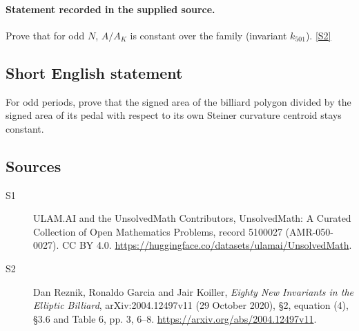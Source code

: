 \documentclass[11pt]{article}
\newcommand{\sref}[2]{\hyperlink{source:#1:#2}{[S#2]}}
\begin{document}
\paragraph{Statement recorded in the supplied source.}
Prove that for odd $N$, $A/A_K$ is constant over the family (invariant $k_{501}$). \sref{5100027}{2}
\subsection{Short English statement}
For odd periods, prove that the signed area of the billiard polygon divided by the signed area of its pedal with respect to its own Steiner curvature centroid stays constant.
\subsection{Sources}
\begin{description}
\item[\hypertarget{source:5100027:1}{S1}] ULAM.AI and the UnsolvedMath Contributors, UnsolvedMath: A Curated Collection of Open Mathematics Problems, record 5100027 (AMR-050-0027). CC BY 4.0. \url{https://huggingface.co/datasets/ulamai/UnsolvedMath}.
\item[\hypertarget{source:5100027:2}{S2}] Dan Reznik, Ronaldo Garcia and Jair Koiller, \emph{Eighty New Invariants in the Elliptic Billiard}, arXiv:2004.12497v11 (29 October 2020), \S2, equation (4), \S3.6 and Table 6, pp. 3, 6--8. \url{https://arxiv.org/abs/2004.12497v11}.
\end{description}
\label{end:5100027}
\end{document}
